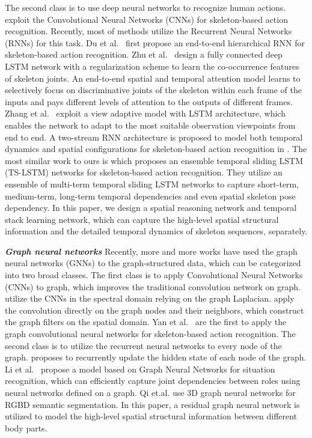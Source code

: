\documentclass[runningheads]{llncs}
\begin{document}
The second class is to use deep neural networks to recognize human actions. \cite{Ke2017A,Kim2017Interpretable} exploit the Convolutional Neural Networks (CNNs) for skeleton-based action recognition. Recently, most of methods utilize the Recurrent Neural Networks (RNNs) for this task. Du et al.~\cite{Du2015Hierarchical} first propose an end-to-end hierarchical RNN for skeleton-based action recognition. Zhu et al.~\cite{Zhu2016Co-Occurrence} design a fully connected deep LSTM network with a regularization scheme to learn the co-occurrence features of skeleton joints. An end-to-end spatial and temporal attention model \cite{Song2017Attention} learns to selectively focus on discriminative joints of the skeleton within each frame of the inputs and pays different levels of attention to the outputs of different frames. Zhang et al.~\cite{Zhang2017View} exploit a view adaptive model with LSTM architecture, which enables the network to adapt to the most suitable observation viewpoints from end to end. A two-stream RNN architecture is proposed to model both temporal dynamics and spatial configurations for skeleton-based action recognition in \cite{Wang2017Modeling}. The most similar work to ours is \cite{Inwoong2017Ensemble} which proposes an ensemble temporal sliding LSTM (TS-LSTM) networks for skeleton-based action recognition. They utilize an ensemble of multi-term temporal sliding LSTM networks to capture short-term, medium-term, long-term temporal dependencies and even spatial skeleton pose dependency. In this paper, we design a spatial reasoning network and temporal stack learning network, which can capture the high-level spatial structural information and the detailed temporal dynamics of skeleton sequences, separately.


\textbf{\emph{Graph neural networks}} \hspace{3mm}
Recently, more and more works have used the graph neural networks (GNNs) to the graph-structured data, which can be categorized into two broad classes. The first class is to apply Convolutional Neural Networks (CNNs) to graph, which improves the traditional convolution network on graph. \cite{henaff2015deep,NIPS2015_5954} utilize the CNNs in the spectral domain relying on the graph Laplacian. \cite{Bruna2014Spectral,niepert2016learning} apply the convolution directly on the graph nodes and their neighbors, which construct the graph filters on the spatial domain. Yan et al.~\cite{Yan2018Spatial} are the first to apply the graph convolutional neural networks for skeleton-based action recognition. The second class is to utilize the recurrent neural networks to every node of the graph. \cite{Scarselli2009graph} proposes to recurrently update the hidden state of each node of the graph. Li et al.~\cite{Li_2017_ICCV} propose a model based on Graph Neural Networks for situation recognition, which can  efficiently capture joint dependencies between roles using neural networks defined on a graph. Qi et.al. \cite{Qi_2017_ICCV} use 3D graph neural networks for RGBD semantic segmentation. In this paper, a residual graph neural network is utilized to model the high-level spatial structural information between different body parts.
\end{document}
